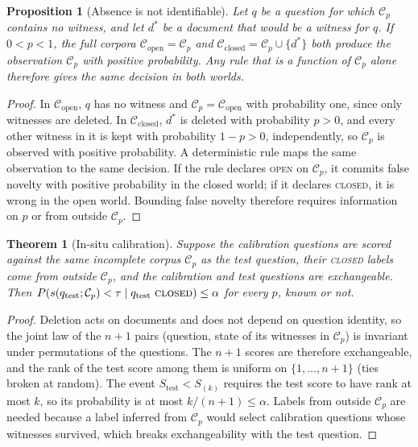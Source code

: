 \documentclass[10pt,a4paper]{article}
\newtheorem{theorem}{Theorem}
\newtheorem{proposition}{Proposition}
\theoremstyle{definition}
\theoremstyle{remark}
\newcommand{\open}{\textup{\textsc{open}}}
\newcommand{\closed}{\textup{\textsc{closed}}}
\begin{document}
\begin{proposition}[Absence is not identifiable]
Let $q$ be a question for which $\mathcal{C}_p$ contains no witness, and let $d^*$ be a document that would be a witness for $q$. If $0<p<1$, the full corpora $\mathcal{C}_{\mathrm{open}}=\mathcal{C}_p$ and $\mathcal{C}_{\mathrm{closed}}=\mathcal{C}_p\cup\{d^*\}$ both produce the observation $\mathcal{C}_p$ with positive probability. Any rule that is a function of $\mathcal{C}_p$ alone therefore gives the same decision in both worlds.
\end{proposition}
\begin{proof}
In $\mathcal{C}_{\mathrm{open}}$, $q$ has no witness and $\mathcal{C}_p=\mathcal{C}_{\mathrm{open}}$ with probability one, since only witnesses are deleted. In $\mathcal{C}_{\mathrm{closed}}$, $d^*$ is deleted with probability $p>0$, and every other witness in it is kept with probability $1-p>0$, independently, so $\mathcal{C}_p$ is observed with positive probability. A deterministic rule maps the same observation to the same decision. If the rule declares \open{} on $\mathcal{C}_p$, it commits false novelty with positive probability in the closed world; if it declares \closed{}, it is wrong in the open world. Bounding false novelty therefore requires information on $p$ or from outside $\mathcal{C}_p$.
\end{proof}

\begin{theorem}[In-situ calibration]
Suppose the calibration questions are scored against the same incomplete corpus $\mathcal{C}_p$ as the test question, their \closed{} labels come from outside $\mathcal{C}_p$, and the calibration and test questions are exchangeable. Then $P(s(q_{\mathrm{test}};\mathcal{C}_p)<\tau\mid q_{\mathrm{test}}\ \closed)\le\alpha$ for every $p$, known or not.
\end{theorem}
\begin{proof}
Deletion acts on documents and does not depend on question identity, so the joint law of the $n+1$ pairs (question, state of its witnesses in $\mathcal{C}_p$) is invariant under permutations of the questions. The $n+1$ scores are therefore exchangeable, and the rank of the test score among them is uniform on $\{1,\dots,n+1\}$ (ties broken at random). The event $S_{\mathrm{test}}<S_{(k)}$ requires the test score to have rank at most $k$, so its probability is at most $k/(n+1)\le\alpha$. Labels from outside $\mathcal{C}_p$ are needed because a label inferred from $\mathcal{C}_p$ would select calibration questions whose witnesses survived, which breaks exchangeability with the test question.
\end{proof}
\end{document}
